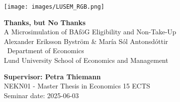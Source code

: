 
\sloppy  %

\texttt{[image: images/LUSEM\_RGB.png]} %

\vspace{2cm}
\begin{center}       
    \vspace*{2cm}
    {\LARGE \textbf{Thanks, but No Thanks} \\ 
     \Large A Microsimulation of BAföG Eligibility and Non-Take-Up} \\
    \vspace{1cm}
    \large Alexander Eriksson Byström \& María Sól Antonsdóttir \\[0.3cm]\ 
    \normalsize Department of Economics \\ 
    Lund University School of Economics and Management
\end{center}
\vspace{2cm}

\vfill
\noindent 
\textbf{Supervisor: Petra Thiemann} \\ 
NEKN01 - Master Thesis in Economics 15 ECTS \\ 
Seminar date: 2025-06-03
\thispagestyle{empty}

\fussy  %

\newpage





